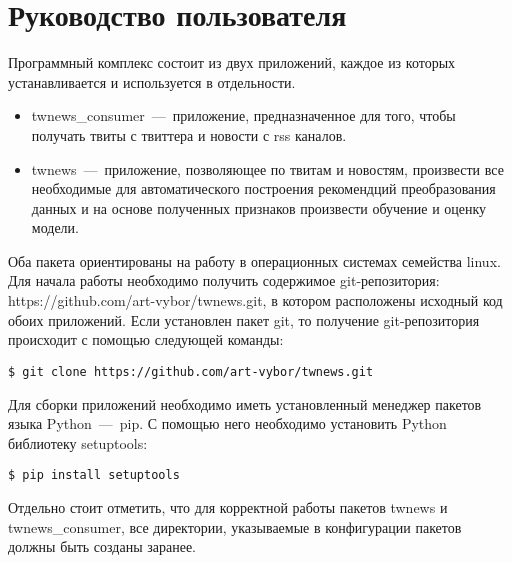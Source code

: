 \section{Руководство пользователя}
\label{sec:documentation}
    Программный комплекс состоит из двух приложений, каждое из которых устанавливается и используется в отдельности.
    \begin{itemize}
        \item twnews\_consumer~---~приложение, предназначенное для того, чтобы получать твиты с твиттера и новости с rss каналов.
        \item twnews~---~приложение, позволяющее по твитам и новостям, произвести все необходимые для автоматического построения рекомендций
        преобразования данных и на основе полученных признаков произвести обучение и оценку модели.
    \end{itemize}

    Оба пакета ориентированы на работу в операционных системах семейства linux.
    Для начала работы необходимо получить содержимое git-репозитория: https://github.com/art-vybor/twnews.git, в котором расположены исходный код обоих приложений.
    Если установлен пакет git, то получение git-репозитория происходит с помощью следующей команды:
    \begin{lstlisting}
$ git clone https://github.com/art-vybor/twnews.git
    \end{lstlisting}
    Для сборки приложений необходимо иметь установленный менеджер пакетов языка Python~---~pip. С помощью него необходимо установить Python библиотеку setuptools:
    \begin{lstlisting}
$ pip install setuptools
    \end{lstlisting}

    Отдельно стоит отметить, что для корректной работы пакетов twnews и twnews\_consumer, все директории, указываемые в конфигурации пакетов должны быть созданы заранее.

    
    
